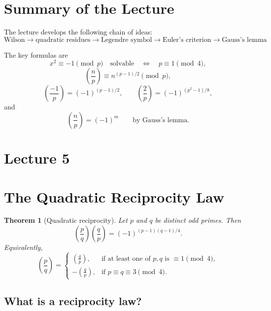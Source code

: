 \documentclass[11pt]{article}
\newtheorem{theorem}{Theorem}[section]
\theoremstyle{remark}
\begin{document}
\section*{Summary of the Lecture}

The lecture develops the following chain of ideas:
\[
\boxed{
\text{Wilson}
\longrightarrow
\text{quadratic residues}
\longrightarrow
\text{Legendre symbol}
\longrightarrow
\text{Euler's criterion}
\longrightarrow
\text{Gauss's lemma}
}.
\]

The key formulas are
\[
    x^2\equiv -1\pmod p
    \quad\text{solvable}
    \quad\Longleftrightarrow\quad
    p\equiv 1\pmod 4,
\]
\[
    \left(\frac np\right)
    \equiv
    n^{(p-1)/2}\pmod p,
\]
\[
    \left(\frac{-1}{p}\right)=(-1)^{(p-1)/2},
    \qquad
    \left(\frac 2p\right)=(-1)^{(p^2-1)/8},
\]
and
\[
    \left(\frac np\right)=(-1)^m
    \qquad\text{by Gauss's lemma}.
\]

\clearpage

\section*{Lecture 5}

\section{The Quadratic Reciprocity Law}

\begin{theorem}[Quadratic reciprocity]
Let $p$ and $q$ be distinct odd primes. Then
\[
    \boxed{
    \left(\frac pq\right)
    \left(\frac qp\right)
    =
    (-1)^{(p-1)(q-1)/4}.
    }
\]
Equivalently,
\[
\left(\frac pq\right)
=
\begin{cases}
\displaystyle\left(\frac qp\right),
    & \text{if at least one of }p,q\text{ is }\equiv 1\pmod 4,\\[2mm]
\displaystyle -\left(\frac qp\right),
    & \text{if }p\equiv q\equiv 3\pmod 4.
\end{cases}
\]
\end{theorem}

\subsection{What is a reciprocity law?}
\end{document}
